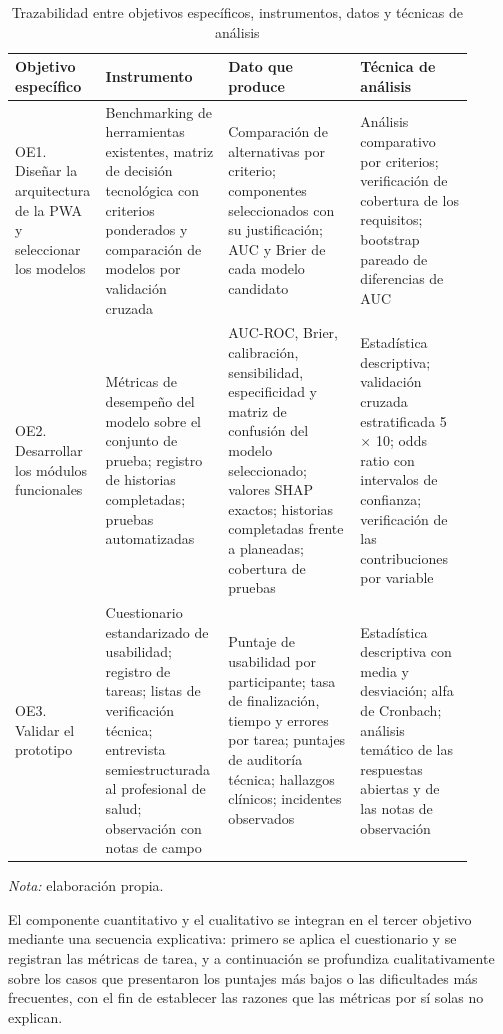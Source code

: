 \documentclass[conference]{IEEEtran}
\begin{document}
\begin{table}[!t]
\centering
\caption{Trazabilidad entre objetivos específicos, instrumentos, datos y técnicas de análisis}
\footnotesize
\renewcommand{\arraystretch}{1.15}
\begin{tabular}{>{\raggedright\arraybackslash}p{0.110\linewidth}>{\raggedright\arraybackslash}p{0.261\linewidth}>{\raggedright\arraybackslash}p{0.287\linewidth}>{\raggedright\arraybackslash}p{0.249\linewidth}}
\hline
\textbf{Objetivo específico} & \textbf{Instrumento} & \textbf{Dato que produce} & \textbf{Técnica de análisis} \\ \hline
OE1. Diseñar la arquitectura de la PWA y seleccionar los modelos & Benchmarking de herramientas existentes, matriz de decisión tecnológica con criterios ponderados y comparación de modelos por validación cruzada & Comparación de alternativas por criterio; componentes seleccionados con su justificación; AUC y Brier de cada modelo candidato & Análisis comparativo por criterios; verificación de cobertura de los requisitos; bootstrap pareado de diferencias de AUC \\ \hline
OE2. Desarrollar los módulos funcionales & Métricas de desempeño del modelo sobre el conjunto de prueba; registro de historias completadas; pruebas automatizadas & AUC-ROC, Brier, calibración, sensibilidad, especificidad y matriz de confusión del modelo seleccionado; valores SHAP exactos; historias completadas frente a planeadas; cobertura de pruebas & Estadística descriptiva; validación cruzada estratificada 5 $\times$ 10; odds ratio con intervalos de confianza; verificación de las contribuciones por variable \\ \hline
OE3. Validar el prototipo & Cuestionario estandarizado de usabilidad; registro de tareas; listas de verificación técnica; entrevista semiestructurada al profesional de salud; observación con notas de campo & Puntaje de usabilidad por participante; tasa de finalización, tiempo y errores por tarea; puntajes de auditoría técnica; hallazgos clínicos; incidentes observados & Estadística descriptiva con media y desviación; alfa de Cronbach; análisis temático de las respuestas abiertas y de las notas de observación \\ \hline
\end{tabular}
\par\smallskip\parbox{\linewidth}{\scriptsize\textit{Nota:} elaboración propia.}
\end{table}
El componente cuantitativo y el cualitativo se integran en el tercer objetivo mediante una secuencia explicativa: primero se aplica el cuestionario y se registran las métricas de tarea, y a continuación se profundiza cualitativamente sobre los casos que presentaron los puntajes más bajos o las dificultades más frecuentes, con el fin de establecer las razones que las métricas por sí solas no explican.
\end{document}
